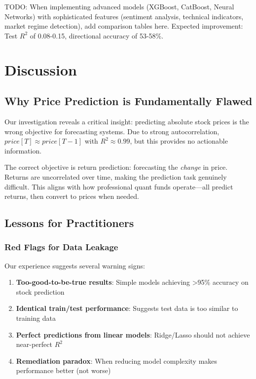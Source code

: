 \documentclass[conference]{IEEEtran}
\begin{document}
TODO: When implementing advanced models (XGBoost, CatBoost, Neural Networks) with sophisticated features (sentiment analysis, technical indicators, market regime detection), add comparison tables here. Expected improvement: Test $R^2$ of 0.08-0.15, directional accuracy of 53-58\%.

\section{Discussion}

\subsection{Why Price Prediction is Fundamentally Flawed}

Our investigation reveals a critical insight: predicting absolute stock prices is the wrong objective for forecasting systems. Due to strong autocorrelation, $price[T] \approx price[T-1]$ with $R^2 \approx 0.99$, but this provides no actionable information.

The correct objective is return prediction: forecasting the \textit{change} in price. Returns are uncorrelated over time, making the prediction task genuinely difficult. This aligns with how professional quant funds operate—all predict returns, then convert to prices when needed.

\subsection{Lessons for Practitioners}

\subsubsection{Red Flags for Data Leakage}

Our experience suggests several warning signs:

\begin{enumerate}
    \item \textbf{Too-good-to-be-true results}: Simple models achieving >95\% accuracy on stock prediction
    \item \textbf{Identical train/test performance}: Suggests test data is too similar to training data
    \item \textbf{Perfect predictions from linear models}: Ridge/Lasso should not achieve near-perfect $R^2$
    \item \textbf{Remediation paradox}: When reducing model complexity makes performance better (not worse)
\end{enumerate}
\end{document}
